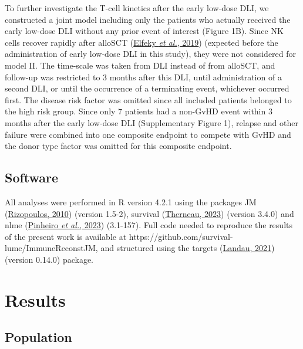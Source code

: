 \documentclass[
  letterpaper,
  DIV=11,
  numbers=noendperiod]{scrreprt}
\begin{document}
To further investigate the T-cell kinetics after the early low-dose DLI,
we constructed a joint model including only the patients who actually
received the early low-dose DLI without any prior event of interest
(Figure 1B). Since NK cells recover rapidly after alloSCT
(\protect\hyperlink{ref-elfekyImmuneReconstitutionFollowing2019a}{Elfeky
\emph{et al.}, 2019}) (expected before the administration of early
low-dose DLI in this study), they were not considered for model II. The
time-scale was taken from DLI instead of from alloSCT, and follow-up was
restricted to 3 months after this DLI, until administration of a second
DLI, or until the occurrence of a terminating event, whichever occurred
first. The disease risk factor was omitted since all included patients
belonged to the high risk group. Since only 7 patients had a non-GvHD
event within 3 months after the early low-dose DLI (Supplementary Figure
1), relapse and other failure were combined into one composite endpoint
to compete with GvHD and the donor type factor was omitted for this
composite endpoint.

\hypertarget{software-3}{%
\subsection{Software}\label{software-3}}

All analyses were performed in R version 4.2.1 using the packages JM
(\protect\hyperlink{ref-rizopoulosJMPackageJoint2010}{Rizopoulos, 2010})
(version 1.5-2), survival
(\protect\hyperlink{ref-survival-package}{Therneau, 2023}) (version
3.4.0) and nlme
(\protect\hyperlink{ref-pinheiroNlmeLinearNonlinear2023}{Pinheiro
\emph{et al.}, 2023}) (3.1-157). Full code needed to reproduce the
results of the present work is available at
https://github.com/survival-lumc/ImmuneReconstJM, and structured using
the targets
(\protect\hyperlink{ref-landauTargetsPackageDynamic2021}{Landau, 2021})
(version 0.14.0) package.

\hypertarget{results-3}{%
\section{Results}\label{results-3}}

\hypertarget{population}{%
\subsection{Population}\label{population}}
\end{document}
